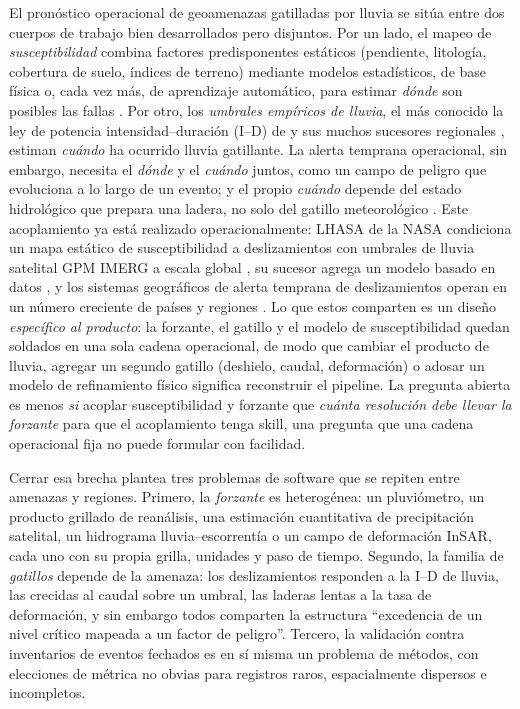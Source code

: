 \documentclass[authoryear,preprint,review,12pt]{elsarticle}
\begin{document}
El pronóstico operacional de geoamenazas gatilladas por lluvia se sitúa entre dos
cuerpos de trabajo bien desarrollados pero disjuntos. Por un lado, el mapeo de
\emph{susceptibilidad} combina factores predisponentes estáticos (pendiente,
litología, cobertura de suelo, índices de terreno) mediante modelos estadísticos,
de base física o, cada vez más, de aprendizaje automático, para estimar
\emph{dónde} son posibles las fallas \citep{reichenbach2018,merghadi2020}. Por
otro, los \emph{umbrales empíricos de lluvia}, el más conocido la ley de potencia
intensidad--duración (I--D) de \citet{caine1980} y sus muchos sucesores
regionales \citep{guzzetti2007,segoni2018,gariano2016}, estiman \emph{cuándo} ha
ocurrido lluvia gatillante. La alerta temprana operacional, sin embargo, necesita
el \emph{dónde} y el \emph{cuándo} juntos, como un campo de peligro que evoluciona
a lo largo de un evento; y el propio \emph{cuándo} depende del estado hidrológico que
prepara una ladera, no solo del gatillo meteorológico \citep{bogaard2018}. Este acoplamiento ya está realizado
operacionalmente: LHASA de la NASA condiciona un mapa estático de susceptibilidad
a deslizamientos con umbrales de lluvia satelital GPM IMERG a escala global
\citep{kirschbaum2018}, su sucesor agrega un modelo basado en datos
\citep{stanley2021}, y los sistemas geográficos de alerta temprana de
deslizamientos operan en un número creciente de países y regiones \citep{guzzetti2020}. Lo que estos comparten
es un diseño \emph{específico al producto}: la forzante, el gatillo y el modelo de
susceptibilidad quedan soldados en una sola cadena operacional, de modo que
cambiar el producto de lluvia, agregar un segundo gatillo (deshielo, caudal,
deformación) o adosar un modelo de refinamiento físico significa reconstruir el
pipeline. La pregunta abierta es menos \emph{si} acoplar susceptibilidad y
forzante que \emph{cuánta resolución debe llevar la forzante} para que el
acoplamiento tenga skill, una pregunta que una cadena operacional fija no puede
formular con facilidad.

Cerrar esa brecha plantea tres problemas de software que se repiten entre
amenazas y regiones. Primero, la \emph{forzante} es heterogénea: un pluviómetro,
un producto grillado de reanálisis, una estimación cuantitativa de precipitación
satelital, un hidrograma lluvia--escorrentía o un campo de deformación InSAR, cada
uno con su propia grilla, unidades y paso de tiempo. Segundo, la familia de
\emph{gatillos} depende de la amenaza: los deslizamientos responden a la I--D de
lluvia, las crecidas al caudal sobre un umbral, las laderas lentas a la tasa de
deformación, y sin embargo todos comparten la estructura ``excedencia de un nivel
crítico mapeada a un factor de peligro''. Tercero, la validación contra
inventarios de eventos fechados es en sí misma un problema de métodos, con
elecciones de métrica no obvias para registros raros, espacialmente dispersos e
incompletos.
\end{document}
